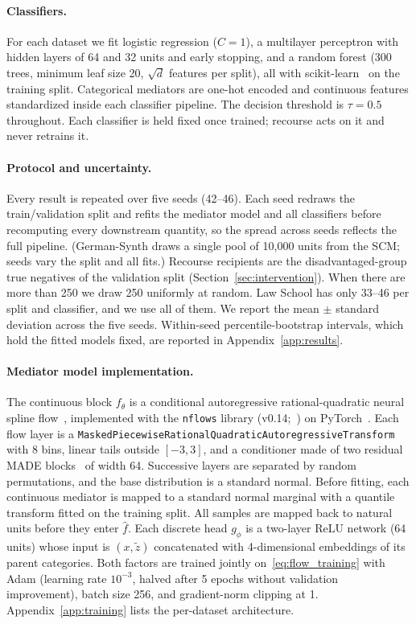\paragraph{Classifiers.}
For each dataset we fit logistic regression ($C=1$), a multilayer perceptron
with hidden layers of 64 and 32 units and early stopping, and a random forest
(300 trees, minimum leaf size 20, $\sqrt{d}$ features per split), all with
scikit-learn~\citep{pedregosa2011scikit} on the training split. Categorical mediators are one-hot encoded and
continuous features standardized inside each classifier pipeline. The
decision threshold is $\tau=0.5$ throughout. Each classifier is held fixed
once trained; recourse acts on it and never retrains it.

\paragraph{Protocol and uncertainty.}
Every result is repeated over five seeds (42--46). Each seed redraws the
train/validation split and refits the mediator model and all classifiers
before recomputing every downstream quantity, so the spread across seeds
reflects the full pipeline. (German-Synth draws a single pool of 10{,}000
units from the SCM; seeds vary the split and all fits.) Recourse recipients
are the disadvantaged-group true negatives of the validation split
(Section~\ref{sec:intervention}). When there are more than 250 we draw 250
uniformly at random. Law School has only 33--46 per split and classifier, and
we use all of them. We report the mean $\pm$ standard deviation across the five seeds.
Within-seed percentile-bootstrap intervals, which hold the fitted models fixed,
are reported in Appendix~\ref{app:results}.

\paragraph{Mediator model implementation.}
The continuous block $f_\theta$ is a conditional autoregressive
rational-quadratic neural spline flow~\citep{durkan2019neural}, implemented
with the \texttt{nflows} library (v0.14;~\citealp{nflows}) on
PyTorch~\citep{paszke2019pytorch}. Each flow layer is a
\texttt{MaskedPiecewiseRationalQuadraticAutoregressiveTransform} with 8 bins,
linear tails outside $[-3,3]$, and a conditioner made of two residual
MADE blocks~\citep{germain2015made} of width 64. Successive layers are
separated by random permutations, and the base distribution is a standard
normal. Before fitting, each continuous mediator is mapped to a standard
normal marginal with a quantile transform fitted on the training split. All
samples are mapped back to natural units before they enter $\hat f$. Each
discrete head $g_\phi$ is a two-layer ReLU network (64 units) whose input is
$(x,\tilde z)$ concatenated with 4-dimensional embeddings of its parent
categories. Both factors are trained jointly on~\eqref{eq:flow_training} with
Adam (learning rate $10^{-3}$, halved after 5 epochs without validation
improvement), batch size 256, and gradient-norm clipping at 1.
Appendix~\ref{app:training} lists the per-dataset architecture.


